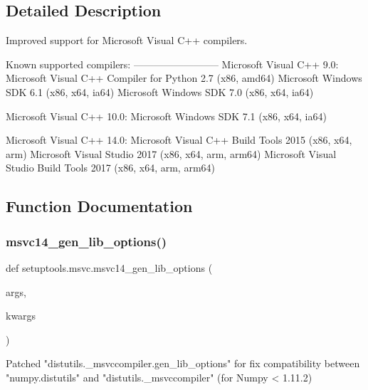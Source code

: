 \subsection{Detailed Description}
\begin{DoxyVerb}Improved support for Microsoft Visual C++ compilers.

Known supported compilers:
--------------------------
Microsoft Visual C++ 9.0:
    Microsoft Visual C++ Compiler for Python 2.7 (x86, amd64)
    Microsoft Windows SDK 6.1 (x86, x64, ia64)
    Microsoft Windows SDK 7.0 (x86, x64, ia64)

Microsoft Visual C++ 10.0:
    Microsoft Windows SDK 7.1 (x86, x64, ia64)

Microsoft Visual C++ 14.0:
    Microsoft Visual C++ Build Tools 2015 (x86, x64, arm)
    Microsoft Visual Studio 2017 (x86, x64, arm, arm64)
    Microsoft Visual Studio Build Tools 2017 (x86, x64, arm, arm64)
\end{DoxyVerb}
 

\subsection{Function Documentation}
\mbox{\label{namespacesetuptools_1_1msvc_aa2d697d927b0bed28a47be76cea5a729}} 
\subsubsection{\texorpdfstring{msvc14\+\_\+gen\+\_\+lib\+\_\+options()}{msvc14\_gen\_lib\_options()}}
{\footnotesize\ttfamily def setuptools.\+msvc.\+msvc14\+\_\+gen\+\_\+lib\+\_\+options (\begin{DoxyParamCaption}\item[{}]{args,  }\item[{}]{kwargs }\end{DoxyParamCaption})}

\begin{DoxyVerb}Patched "distutils._msvccompiler.gen_lib_options" for fix
compatibility between "numpy.distutils" and "distutils._msvccompiler"
(for Numpy < 1.11.2)
\end{DoxyVerb}
 \mbox{\label{namespacesetuptools_1_1msvc_abf4312c4a50e38b0965b836584cf402c}} 
